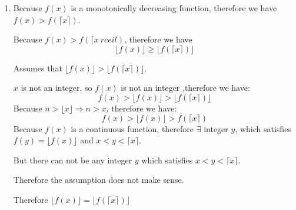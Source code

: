 \documentclass[12pt,a4paper]{article}
\makeatletter
\newtheorem*{solution}{Solution}
\theoremstyle{definition}
\renewenvironment{solution}[1][Solution] {\par\pushQED{\qed}\normalfont\topsep6\p@\@plus6\p@\relax\trivlist\item[\hskip\labelsep\bfseries#1\@addpunct{.}]\ignorespaces}{\popQED\endtrivlist\@endpefalse} \makeatother
\makeatother
\begin{document}
\begin{enumerate}
\begin{solution}
\begin{itemize}
        		    Because $f(x)$ is a monotonically decreasing function, therefore we have $f(x)>f(\lceil x \rceil)$.
        		    
        		    Because $f(x)>f(\lceil x\ rceil)$, therefore we have 
        		    \begin{equation*}
        		        \lfloor f(x) \rfloor\ge \lfloor f(\lceil x \rceil) \rfloor
        		    \end{equation*}
        		    
        		    Assumes that $\lfloor f(x) \rfloor> \lfloor f(\lceil x \rceil) \rfloor$.
        		    
        		    $x$ is not an integer, so $f(x)$ is not an integer ,therefore we have:
        		    \begin{equation*}
        		        f(x)>\lfloor f(x) \rfloor>\lfloor f(\lceil x \rceil) \rfloor
        		    \end{equation*} 
        		    Because $n>\lfloor x \rfloor\Rightarrow n>x$, therefore we have:
        		    \begin{equation*}
        		        f(x)>\lfloor f(x) \rfloor>f(\lceil x \rceil)
        		    \end{equation*}
        		    Because $f(x)$ is a continuous function, therefore $\exists$ integer $y$, which satisfies $f(y)=\lfloor f(x) \rfloor$ and $x<y<\lceil x \rceil$.
        		    
        		    But there can not be any integer $y$ which satisfies $x<y<\lceil x \rceil$.
        		    
        		    Therefore the assumption does not make sense.
        		    
        		    Therefore $\lfloor f(x) \rfloor=\lfloor f(\lceil x \rceil) \rfloor$
        		    
        	\end{itemize}
        	
        	
        	
        	
        	

\end{solution}
\end{enumerate}
\end{document}
